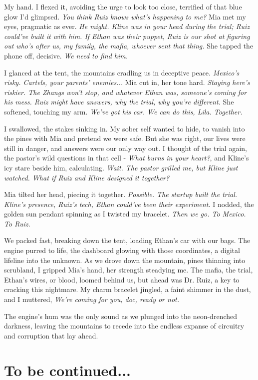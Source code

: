 \documentclass[12pt,oneside]{book} %
\begin{document}
My hand. I flexed it, avoiding the urge to look too close, terrified of that blue glow I’d glimpsed. \textit{You think Ruiz knows what’s happening to me?} Mia met my eyes, pragmatic as ever. \textit{He might. Kline was in your head during the trial; Ruiz could’ve built it with him. If Ethan was their puppet, Ruiz is our shot at figuring out who’s after us, my family, the mafia, whoever sent that thing.} She tapped the phone off, decisive. \textit{We need to find him.}

I glanced at the tent, the mountains cradling us in deceptive peace. \textit{Mexico’s risky. Cartels, your parents’ enemies...} Mia cut in, her tone hard. \textit{Staying here’s riskier. The Zhangs won’t stop, and whatever Ethan was, someone’s coming for his mess. Ruiz might have answers, why the trial, why you’re different.} She softened, touching my arm. \textit{We’ve got his car. We can do this, Lila. Together.}

I swallowed, the stakes sinking in. My sober self wanted to hide, to vanish into the pines with Mia and pretend we were safe. But she was right, our lives were still in danger, and answers were our only way out. I thought of the trial again, the pastor’s wild questions in that cell - \textit{What burns in your heart?}, and Kline’s icy stare beside him, calculating. \textit{Wait. The pastor grilled me, but Kline just watched. What if Ruiz and Kline designed it together?}

Mia tilted her head, piecing it together. \textit{Possible. The startup built the trial. Kline’s presence, Ruiz’s tech, Ethan could’ve been their experiment.} I nodded, the golden sun pendant spinning as I twisted my bracelet. \textit{Then we go. To Mexico. To Ruiz.}

We packed fast, breaking down the tent, loading Ethan’s car with our bags. The engine purred to life, the dashboard glowing with those coordinates, a digital lifeline into the unknown. As we drove down the mountain, pines thinning into scrubland, I gripped Mia’s hand, her strength steadying me. The mafia, the trial, Ethan’s wires, or blood, loomed behind us, but ahead was Dr. Ruiz, a key to cracking this nightmare. My charm bracelet jingled, a faint shimmer in the dust, and I muttered, \textit{We’re coming for you, doc, ready or not.}

The engine's hum was the only sound as we plunged into the neon-drenched darkness, leaving the mountains to recede into the endless expanse of circuitry and corruption that lay ahead.

\section{To be continued...}
\end{document}
